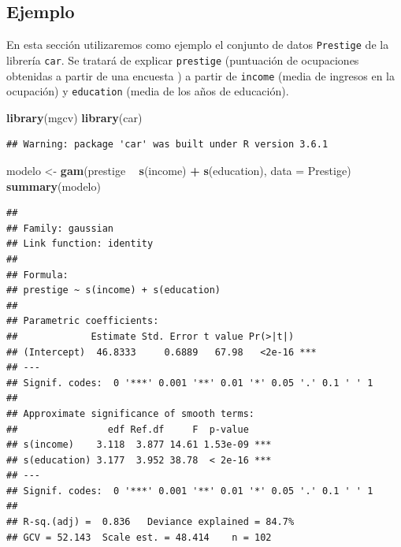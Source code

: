 \documentclass[]{book}
\newenvironment{Shaded}{\begin{snugshade}}{\end{snugshade}}
\newcommand{\DataTypeTok}[1]{\textcolor[rgb]{0.13,0.29,0.53}{#1}}
\newcommand{\KeywordTok}[1]{\textcolor[rgb]{0.13,0.29,0.53}{\textbf{#1}}}
\newcommand{\NormalTok}[1]{#1}
\newcommand{\OperatorTok}[1]{\textcolor[rgb]{0.81,0.36,0.00}{\textbf{#1}}}
\newcommand{\StringTok}[1]{\textcolor[rgb]{0.31,0.60,0.02}{#1}}
\begin{document}
\hypertarget{ejemplo-3}{%
\subsection{Ejemplo}\label{ejemplo-3}}

En esta sección utilizaremos como ejemplo el conjunto de datos \texttt{Prestige} de la librería \texttt{car}.
Se tratará de explicar \texttt{prestige} (puntuación de ocupaciones obtenidas a partir de una encuesta )
a partir de \texttt{income} (media de ingresos en la ocupación) y \texttt{education} (media de los años de
educación).

\begin{Shaded}
\begin{Highlighting}[]
\KeywordTok{library}\NormalTok{(mgcv)}
\KeywordTok{library}\NormalTok{(car)}
\end{Highlighting}
\end{Shaded}

\begin{verbatim}
## Warning: package 'car' was built under R version 3.6.1
\end{verbatim}

\begin{Shaded}
\begin{Highlighting}[]
\NormalTok{modelo <-}\StringTok{ }\KeywordTok{gam}\NormalTok{(prestige }\OperatorTok{~}\StringTok{ }\KeywordTok{s}\NormalTok{(income) }\OperatorTok{+}\StringTok{ }\KeywordTok{s}\NormalTok{(education), }\DataTypeTok{data =}\NormalTok{ Prestige)}
\KeywordTok{summary}\NormalTok{(modelo)}
\end{Highlighting}
\end{Shaded}

\begin{verbatim}
## 
## Family: gaussian 
## Link function: identity 
## 
## Formula:
## prestige ~ s(income) + s(education)
## 
## Parametric coefficients:
##             Estimate Std. Error t value Pr(>|t|)    
## (Intercept)  46.8333     0.6889   67.98   <2e-16 ***
## ---
## Signif. codes:  0 '***' 0.001 '**' 0.01 '*' 0.05 '.' 0.1 ' ' 1
## 
## Approximate significance of smooth terms:
##                edf Ref.df     F  p-value    
## s(income)    3.118  3.877 14.61 1.53e-09 ***
## s(education) 3.177  3.952 38.78  < 2e-16 ***
## ---
## Signif. codes:  0 '***' 0.001 '**' 0.01 '*' 0.05 '.' 0.1 ' ' 1
## 
## R-sq.(adj) =  0.836   Deviance explained = 84.7%
## GCV = 52.143  Scale est. = 48.414    n = 102
\end{verbatim}
\end{document}
